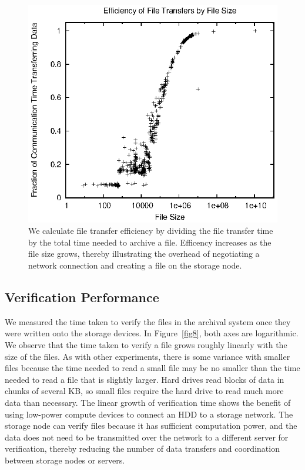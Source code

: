 \begin{figure}[!ht]
\includegraphics[width=\linewidth]{fig7.eps}
\caption{We calculate file transfer efficiency by dividing the file transfer time by the total time needed to archive a file.  Efficency increases as the file size grows, thereby illustrating the overhead of negotiating a network connection and creating a file on the storage node.}
\label{fig7}
\end{figure}

\subsection{Verification Performance}
We measured the time taken to verify the files in the archival system once they were written onto the storage devices.  In Figure~\ref{fig8}, both axes are logarithmic.  We observe that the time taken to verify a file grows roughly linearly with the size of the files.  As with other experiments, there is some variance with smaller files because the time needed to read a small file may be no smaller than the time needed to read a file that is slightly larger.  Hard drives read blocks of data in chunks of several KB, so small files require the hard drive to read much more data than necessary.  The linear growth of verification time shows the benefit of using low-power compute devices to connect an HDD to a storage network.  The storage node can verify files because it has sufficient computation power, and the data does not need to be transmitted over the network to a different server for verification, thereby reducing the number of data transfers and coordination between storage nodes or servers.


